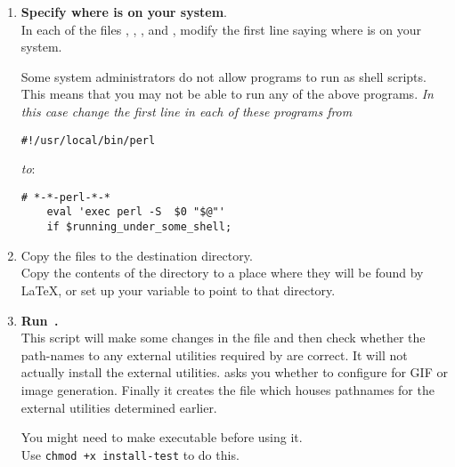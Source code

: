 \begin{enumerate}
\item 
\textbf{Specify where \Perl{} is on your system}. \\
In each of the files , , ,
 and ,
modify the first line saying where \Perl{} is on your system.


\noindent
Some system administrators do not allow \Perl{} programs to run as shell scripts. 
This means that you may not be able to run any of the above programs. 
\emph{In this case change the first line in each of these programs from }
\html{\smallskip}
\begin{small}
\verb|#!/usr/local/bin/perl | 
\end{small}
\html{\smallskip}\emph{to}:
\begin{small}
\begin{verbatim}
# *-*-perl-*-*
    eval 'exec perl -S  $0 "$@"'
    if $running_under_some_shell; 
\end{verbatim}
\end{small}

%
%
\item
Copy the files to the destination directory.\\
Copy the contents of the  directory to a place where they
will be found by \LaTeX, or set up your  variable to point
to that directory.

%
%
\item 
\textbf{Run \,.} \\
This \Perl{} script will make some changes in the  file
and then check whether the path-names to any external utilities
required by  are correct.
It will not actually install the external utilities. 
 asks you whether to configure for GIF or
 image generation.
Finally it creates the file  which houses pathnames for the
external utilities determined earlier.

\smallskip\noindent
You might need to make  executable before using it.\\
Use \verb/chmod +x install-test/ to do this.


\end{enumerate}
